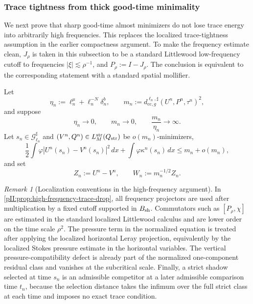 \documentclass[11pt]{article}
\numberwithin{equation}{section}
\theoremstyle{plain}
\theoremstyle{definition}
\theoremstyle{remark}
\newtheorem{remark}{Remark}[section]
\newcommand{\str}{\mathrm{str}}
\newcommand{\cc}{\mathrm{cc}}
\newcommand{\dx}{\,dx}
\begin{document}
\subsubsection{Trace tightness from thick good-time minimality}

We next prove that sharp good-time almost minimizers do not lose trace energy into arbitrarily high frequencies.  This replaces the localized trace-tightness assumption in the earlier compactness argument.  To make the frequency estimate clean, $J_\rho$ is taken in this subsection to be a standard Littlewood low-frequency cutoff to frequencies $|\xi|\lesssim\rho^{-1}$, and $P_\rho:=I-J_\rho$.  The conclusion is equivalent to the corresponding statement with a standard spatial mollifier.

Let
\begin{equation}\label{pII:eq:eta-mn-sharp}
        \eta_n:=\ell_n^\mu+\ell_n^{-N}\delta_n^b,
        \qquad
        m_n:=d^{\ell_n,\sharp}_{\cc,g}(U^n,P^n,\tau^n)^2,
\end{equation}
and suppose
\begin{equation}\label{pII:eq:failed-sharp-selection}
        \eta_n\to0,
        \qquad m_n\to0,
        \qquad \frac{m_n}{\eta_n}\to\infty.
\end{equation}
Let $s_n\in\mathcal G_{\ell_n}^\sharp$ and $(V^n,Q^n)\in L_M^{\str}(Q_{\rm str})$ be $o(m_n)$-minimizers,
\begin{equation}\label{pII:eq:sharp-almost-minimizer}
        \frac12\int\varphi|U^n(s_n)-V^n(s_n)|^2\dx
        +\int\varphi\kappa^n(s_n)\dx
        \le m_n+o(m_n),
\end{equation}
and set
\begin{equation}\label{pII:eq:Zn-Wn}
        Z_n:=U^n-V^n,
        \qquad
        W_n:=m_n^{-1/2}Z_n.
\end{equation}


\begin{remark}[Localization conventions in the high-frequency argument]\label{pII:rem:hf-localization-conventions}
In \cref{pII:prop:high-frequency-trace-drop}, all frequency projectors are used after multiplication by a fixed cutoff supported in \(B_{\rm sh}\).  Commutators such as \([P_\rho,\chi]\) are estimated in the standard localized Littlewood calculus and are lower order on the time scale \(\rho^2\).  The pressure term in the normalized equation is treated after applying the localized horizontal Leray projection, equivalently by the localized Stokes pressure estimate in the horizontal variables.  The vertical pressure-compatibility defect is already part of the normalized one-component residual class and vanishes at the subcritical scale.  Finally, a strict shadow selected at time \(s_n\) is an admissible competitor at a later admissible comparison time \(t_n\), because the selection distance takes the infimum over the full strict class at each time and imposes no exact trace condition.
\end{remark}
\end{document}
